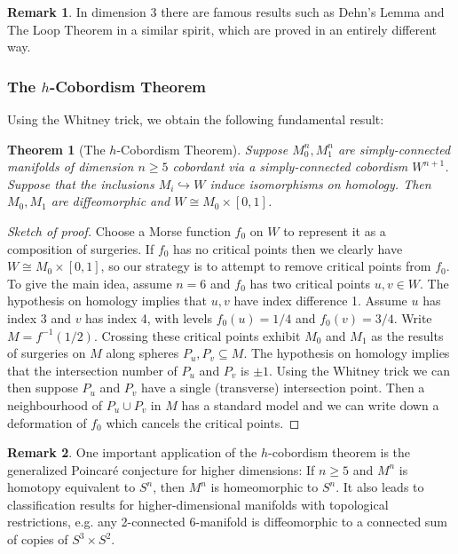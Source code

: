 \documentclass{article}
\newtheorem*{theorem}{Theorem}
\theoremstyle{definition}
\newtheorem*{remark}{Remark}
\begin{document}
\begin{remark}
    In dimension 3 there are famous results such as Dehn's Lemma and The Loop
    Theorem in a similar spirit, which are proved in an entirely different way.
\end{remark}

\subsubsection*{The $h$-Cobordism Theorem}

Using the Whitney trick, we obtain the following fundamental result:

\begin{theorem}[The $h$-Cobordism Theorem]
    Suppose $M_0^n,M_1^n$ are simply-connected manifolds of dimension $n\ge5$
    cobordant via a simply-connected cobordism $W^{n+1}$. Suppose that the
    inclusions $M_i\hookrightarrow W$ induce isomorphisms on homology. Then
    $M_0,M_1$ are diffeomorphic and $W\cong M_0\times[0,1]$.
\end{theorem}

\begin{proof}[Sketch of proof]
    Choose a Morse function $f_0$ on $W$ to represent it as a composition of
    surgeries. If $f_0$ has no critical points then we clearly have
    $W\cong M_0\times[0,1]$, so our strategy is to attempt to remove critical
    points from $f_0$. To give the main idea, assume $n=6$ and $f_0$ has two
    critical points $u,v\in W$. The hypothesis on homology implies that $u,v$
    have index difference 1. Assume $u$ has index 3 and $v$ has index 4, with
    levels $f_0(u)=1/4$ and $f_0(v)=3/4$. Write $M=f^{-1}(1/2)$. Crossing these
    critical points exhibit $M_0$ and $M_1$ as the results of surgeries on $M$
    along spheres $P_u,P_v\subseteq M$. The hypothesis on homology implies that
    the intersection number of $P_u$ and $P_v$ is $\pm1$. Using the Whitney
    trick we can then suppose $P_u$ and $P_v$ have a single (transverse)
    intersection point. Then a neighbourhood of $P_u\cup P_v$ in $M$ has a
    standard model and we can write down a deformation of $f_0$ which cancels
    the critical points.
\end{proof}

\begin{remark}
    One important application of the $h$-cobordism theorem is the generalized
    Poincar\'e conjecture for higher dimensions: If $n\ge5$ and $M^n$ is
    homotopy equivalent to $S^n$, then $M^n$ is homeomorphic to $S^n$. It also
    leads to classification results for higher-dimensional manifolds with
    topological restrictions, e.g. any 2-connected 6-manifold is diffeomorphic
    to a connected sum of copies of $S^3\times S^2$.
\end{remark}
\end{document}
